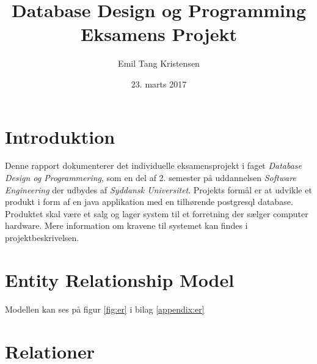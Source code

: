 \documentclass[a4paper]{article}
\title{\textbf{Database Design og Programming Eksamens Projekt}}
\author{Emil Tang Kristensen}
\date{23. marts 2017}
\begin{document}
\maketitle
\tableofcontents
\newpage

\section{Introduktion}
Denne rapport dokumenterer det individuelle eksamensprojekt i faget \emph{Database Design og Programmering}, som en del af 2. semester på uddannelsen \emph{Software Engineering} der udbydes af \emph{Syddansk Universitet}.
Projekts formål er at udvikle et produkt i form af en java applikation med en tilhørende postgresql database.
Produktet skal være et salg og lager system til et forretning der sælger computer hardware.
Mere information om kravene til systemet kan findes i projektbeskrivelsen.

\section{Entity Relationship Model}
Modellen kan ses på figur \ref{fig:er} i bilag \ref{appendix:er}

\section{Relationer}
\end{document}
